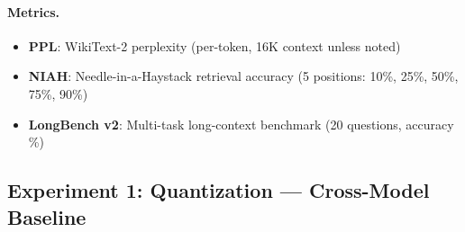 \paragraph{Metrics.}
\begin{itemize}
    \item \textbf{PPL}: WikiText-2 perplexity (per-token, 16K context unless noted)
    \item \textbf{NIAH}: Needle-in-a-Haystack retrieval accuracy (5 positions: 10\%, 25\%, 50\%, 75\%, 90\%)
    \item \textbf{LongBench v2}: Multi-task long-context benchmark (20 questions, accuracy \%)
\end{itemize}

\subsection{Experiment 1: Quantization --- Cross-Model Baseline}
\label{sec:exp-quant}

